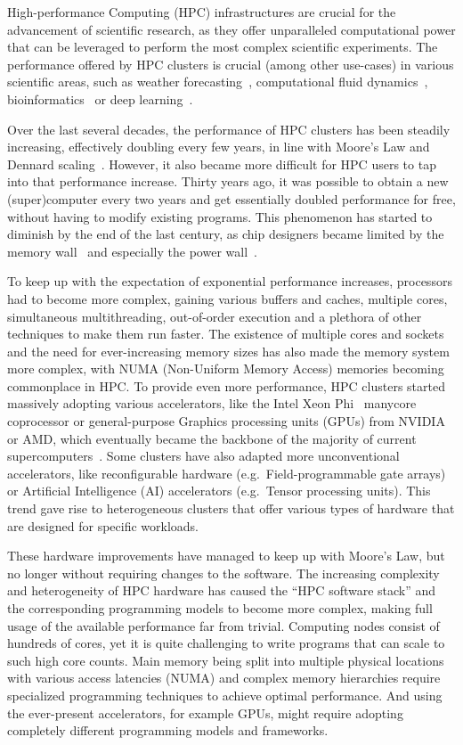 High-performance Computing (HPC) infrastructures are crucial for the advancement of scientific
research, as they offer unparalleled computational power that can be leveraged to perform the most
complex scientific experiments. The performance offered by HPC clusters is crucial (among other
use-cases) in various scientific areas, such as weather forecasting~\cite{wrf},
computational fluid dynamics~\cite{cfd}, bioinformatics~\cite{bioinformatics} or deep
learning~\cite{hpcdl}.

Over the last several decades, the performance of HPC clusters has been steadily increasing,
effectively doubling every few years, in line with Moore's Law and Dennard
scaling~\cite{mooreslaw}. However, it also became more difficult for HPC users to tap into
that performance increase. Thirty years ago, it was possible to obtain a new (super)computer every
two years and get essentially doubled performance for free, without having to modify existing
programs. This phenomenon has started to diminish by the end of the last century, as chip designers
became limited by the memory wall~\cite{memorywall} and especially the power
wall~\cite{powerwall}.

To keep up with the expectation of exponential performance increases, processors had to become more
complex, gaining various buffers and caches, multiple cores, simultaneous multithreading,
out-of-order execution and a plethora of other techniques to make them run faster. The existence of
multiple cores and sockets and the need for ever-increasing memory sizes has also made the memory
system more complex, with NUMA (Non-Uniform Memory Access) memories becoming commonplace in HPC. To
provide even more performance, HPC clusters started massively adopting various accelerators, like
the Intel Xeon Phi~\cite{xeonphi} manycore coprocessor or general-purpose Graphics
processing units (GPUs) from NVIDIA or AMD, which eventually became the backbone of the majority of
current supercomputers~\cite{top500gpu}. Some clusters have also adapted more unconventional
accelerators, like reconfigurable hardware (e.g.\ Field-programmable gate arrays) or Artificial
Intelligence (AI) accelerators (e.g.\ Tensor processing units). This trend gave rise to
heterogeneous clusters that offer various types of hardware that are designed for specific
workloads.

These hardware improvements have managed to keep up with Moore's Law, but no longer without
requiring changes to the software. The increasing complexity and heterogeneity of HPC hardware has
caused the ``HPC software stack'' and the corresponding programming models to become more complex,
making full usage of the available performance far from trivial. Computing nodes consist of
hundreds of cores, yet it is quite challenging to write programs that can scale to such high core
counts. Main memory being split into multiple physical locations with various access latencies
(NUMA) and complex memory hierarchies require specialized programming techniques to achieve optimal
performance. And using the ever-present accelerators, for example GPUs, might require adopting
completely different programming models and frameworks.

